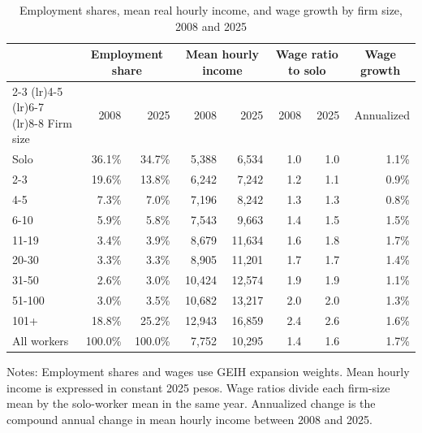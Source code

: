 \begin{table}[htbp]
  \centering
  \caption{Employment shares, mean real hourly income, and wage growth by firm size, 2008 and 2025}
  \label{tab:descriptive-core-size-2008-2025}
  \small
  \begin{tabular}{lrrrrrrr}
    \toprule
    & \multicolumn{2}{c}{Employment share} & \multicolumn{2}{c}{Mean hourly income} & \multicolumn{2}{c}{Wage ratio to solo} & \multicolumn{1}{c}{Wage growth} \\
    \cmidrule(lr){2-3} \cmidrule(lr){4-5} \cmidrule(lr){6-7} \cmidrule(lr){8-8}
    Firm size & 2008 & 2025 & 2008 & 2025 & 2008 & 2025 & Annualized \\
    \midrule
    Solo & 36.1\% & 34.7\% & 5,388 & 6,534 & 1.0 & 1.0 & 1.1\% \\
    2-3 & 19.6\% & 13.8\% & 6,242 & 7,242 & 1.2 & 1.1 & 0.9\% \\
    4-5 & 7.3\% & 7.0\% & 7,196 & 8,242 & 1.3 & 1.3 & 0.8\% \\
    6-10 & 5.9\% & 5.8\% & 7,543 & 9,663 & 1.4 & 1.5 & 1.5\% \\
    11-19 & 3.4\% & 3.9\% & 8,679 & 11,634 & 1.6 & 1.8 & 1.7\% \\
    20-30 & 3.3\% & 3.3\% & 8,905 & 11,201 & 1.7 & 1.7 & 1.4\% \\
    31-50 & 2.6\% & 3.0\% & 10,424 & 12,574 & 1.9 & 1.9 & 1.1\% \\
    51-100 & 3.0\% & 3.5\% & 10,682 & 13,217 & 2.0 & 2.0 & 1.3\% \\
    101+ & 18.8\% & 25.2\% & 12,943 & 16,859 & 2.4 & 2.6 & 1.6\% \\
    \addlinespace
    All workers & 100.0\% & 100.0\% & 7,752 & 10,295 & 1.4 & 1.6 & 1.7\% \\
    \bottomrule
  \end{tabular}
  \vspace{0.3em}
  \begin{minipage}{0.95\textwidth}
  \footnotesize
  Notes: Employment shares and wages use GEIH expansion weights. Mean hourly income is expressed in constant 2025 pesos. Wage ratios divide each firm-size mean by the solo-worker mean in the same year. Annualized change is the compound annual change in mean hourly income between 2008 and 2025.
  \end{minipage}
\end{table}
